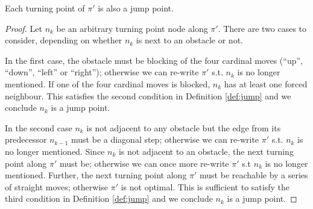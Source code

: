 \begin{lemma}
\label{lemma:turningpoints}
Each turning point of $\pi'$ is also a jump point.
\end{lemma}
\begin{proof}
Let $n_{k}$ be an arbitrary turning point node along $\pi'$. 
There are two cases to consider, depending on whether $n_{k}$ is next
to an obstacle or not.
\par
In the first case, the obstacle must be blocking of the four cardinal 
moves (``up'', ``down'', ``left'' or ``right''); otherwise we can re-write 
$\pi'$ s.t. $n_{k}$ is no longer mentioned.
If one of the four cardinal moves is blocked, $n_{k}$ has at least one
forced neighbour. This satisfies the second condition in Definition
\ref{def:jump} and we conclude $n_{k}$ is a jump point.
\par
In the second case $n_{k}$ is not adjacent to any obstacle but the edge
from its predecessor $n_{k-1}$ must be a diagonal step; otherwise we can 
re-write $\pi'$ s.t. $n_{k}$ is no longer mentioned.
Since $n_{k}$ is not adjacent to an obstacle, the next turning point along 
$\pi'$ must be; otherwise we can once more re-write $\pi'$ s.t $n_{k}$ is no longer
mentioned. Further, the next turning point along $\pi'$ must be reachable 
by a series of straight moves; otherwise $\pi'$ is not optimal.
This is sufficient to satisfy the third condition in Definition \ref{def:jump} and
we conclude $n_{k}$ is a jump point.
\end{proof}

